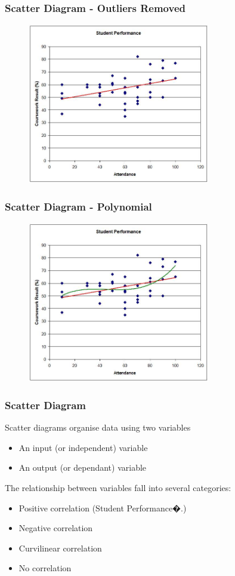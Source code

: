 \begin{frame}
\frametitle{Scatter Diagram - Outliers Removed}
\begin{figure}
	\centering
		\includegraphics[width = 8cm]{images/scattertrend2.jpg}
	\label{fig:studentc}
\end{figure}
\end{frame}






\begin{frame}
\frametitle{Scatter Diagram - Polynomial}
\begin{figure}
	\centering
		\includegraphics[width = 8cm]{images/scattertrend3.jpg}
	\label{fig:studentd}
\end{figure}
\end{frame}




\begin{frame}
\frametitle{Scatter Diagram}
Scatter diagrams organise data using two variables
\begin{itemize}
	\item An input (or independent) variable
	\item An output (or dependant) variable
\end{itemize}
The relationship between variables fall into several categories:
\begin{itemize}
	\item Positive correlation (Student Performance�.)
	\item Negative correlation
	\item Curvilinear correlation
	\item No correlation
\end{itemize}
\end{frame}





